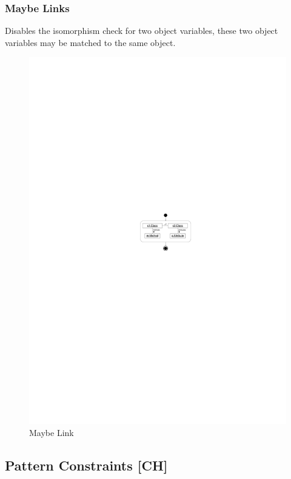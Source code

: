 \subsubsection{Maybe Links}

Disables the isomorphism check for two object variables, these two object variables may be matched to the same object.


\begin{figure}[htbp]
  \centering
  \includegraphics[scale=1.5]{figures/MaybeLink}
  \caption{Maybe Link}
  \label{fig:maybeLink}
\end{figure}

\subsection{Pattern Constraints [CH]}

